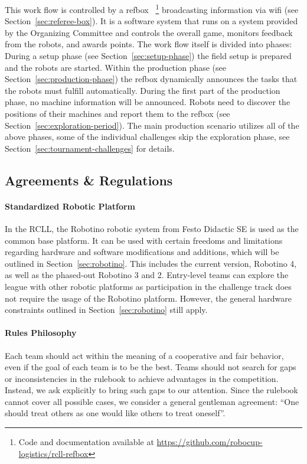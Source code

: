 \documentclass[12pt,twoside]{article}
\newcommand{\refsec}[1]{Section~\ref{#1}}
\begin{document}
This work flow is controlled by a \acf{refbox}~\cite{RCI-RefBox}%
\footnote{Code and documentation available at
\url{https://github.com/robocup-logistics/rcll-refbox}}
broadcasting information via wifi (see \refsec{sec:referee-box}).
It is a software system that runs on a
system provided by the Organizing Committee and controls the overall game,
monitors feedback from the robots, and awards points.
The work flow itself is divided into phases:
During a setup phase (see \refsec{sec:setup-phase})
the field setup is prepared and the robots are started.
Within the production phase (see \refsec{sec:production-phase}) the
\ac{refbox} dynamically announces the tasks that the robots must fulfill
automatically. During the first part of the production phase, no machine
information will be announced.
Robots need to discover the positions of their machines and report
them to the \ac{refbox} (see \refsec{sec:exploration-period}).
The main production scenario utilizes all of the above phases, some of the
individual challenges skip the exploration phase, see
\refsec{sec:tournament-challenges} for details.

\subsection{Agreements \& Regulations}
\label{sec:agreements}
\paragraph{Standardized Robotic Platform}
In the \ac{RCLL}, the Robotino robotic system from Festo Didactic SE is used as
the common base platform.
It can be used with certain freedoms and limitations regarding hardware and
software modifications and additions, which will be outlined in
\refsec{sec:robotino}.
This includes the current version, Robotino 4, as well as the phased-out
Robotino 3 and 2.
Entry-level teams can explore the league with other robotic platforms as
participation in the challenge track does not require the usage of the
Robotino platform. However, the general hardware constraints outlined in
\refsec{sec:robotino} still apply.

\paragraph{Rules Philosophy}
Each team should act within the meaning of a cooperative and fair behavior,
even if the goal of each team is to be the best.
Teams should not search for gaps or inconsistencies in the rulebook to achieve
advantages in the competition. Instead, we ask explicitly to bring such gaps
to our attention. Since the rulebook cannot cover all possible cases, we
consider a general gentleman agreement:
``One should treat others as one would like others to treat oneself''.
\end{document}
